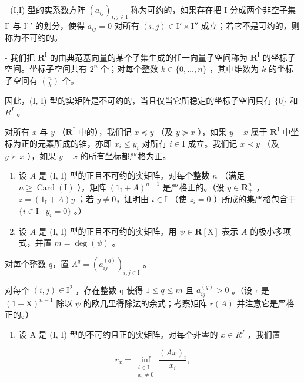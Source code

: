- (I,I) 型的实系数方阵 \((a_{ij})_{i,j\in \mathrm{I}}\) 称为可约的，如果存在把 I 分成两个非空子集 I' 与 I'\,' 的划分，使得 \(a_{ij} = 0\) 对所有 \((i,j)\in \mathrm{I}'\times \mathrm{I}''\) 成立；若它不是可约的，则称为不可约的。

- 我们把 \(\mathbf{R}^{\mathrm{I}}\) 的由典范基向量的某个子集生成的任一向量子空间称为 \(\mathbf{R}^{\mathrm{I}}\) 的坐标子空间。坐标子空间共有 \(2^{n}\) 个；对每个整数 \(k\in\{0,\ldots,n\}\) ，其中维数为 \(k\) 的坐标子空间有 \(\binom{n}{k}\) 个。

因此，(I, I) 型的实矩阵是不可约的，当且仅当它所稳定的坐标子空间只有 \(\{0\}\) 和 \(R^{I}\) 。

对所有 \(x\) 与 \(y\) （\(\mathbf{R}^{\mathrm{I}}\) 中的），我们记 \(x \preccurlyeq y\) （及 \(y \succcurlyeq x\) ），如果 \(y - x\) 属于 \(\mathbf{R}^{\mathrm{I}}\) 中坐标为正的元素所成的锥，亦即 \(x_i \leqslant y_i\) 对所有 \(i \in \mathrm{I}\) 成立。我们记 \(x \prec y\) （及 \(y \succ x\) ），如果 \(y - x\) 的所有坐标都严格为正。

\begin{enumerate}
\def\labelenumi{\arabic{enumi})}
\setcounter{enumi}{9}
\item
  设 \(A\) 是 (I, I) 型的正且不可约的实矩阵。对每个整数 \(n\) （满足 \(n \geqslant \operatorname{Card}(\mathrm{I})\) ），矩阵 \((1_{\mathrm{I}} + A)^{n-1}\) 是严格正的。（设 \(y \in \mathbf{R}_{+}^{n}\) ，\(z = (1_{\mathrm{I}} + A)y\) ；若 \(y \neq 0\)，证明由 \(i \in \mathrm{I}\) （使 \(z_{i} = 0\) ）所成的集严格包含于 \(\{i \in \mathrm{I} \mid y_{i} = 0\}\) 。）
\item
  设 \(A\) 是 (I, I) 型的正且不可约的实矩阵。用 \(\psi \in \mathbf{R}[\mathrm{X}]\) 表示 \(A\) 的极小多项式，并置 \(m = \deg(\psi)\) 。
\end{enumerate}

对每个整数 \(q\)，置 \(A^q = (a_{ij}^{(q)})_{i,j \in \mathrm{I}}\) 。

对每个 \((i,j)\in\mathrm{I}^{2}\) ，存在整数 q 使得 \(1\leqslant q\leqslant m\) 且 \(a_{ij}^{(q)}>0\) 。（设 r 是 \((1+\mathrm{X})^{n-1}\) 除以 \(\psi\) 的欧几里得除法的余式；考察矩阵 \(r(A)\) 并注意它是严格正的。）

\begin{enumerate}
\def\labelenumi{\arabic{enumi})}
\setcounter{enumi}{11}
\tightlist
\item
  设 A 是 (I, I) 型的不可约且正的实矩阵。对每个非零的 \(x \in R^{I}\) ，我们置
\end{enumerate}

\[
r_{x} = \inf_{\substack{i\in \mathrm{I}\\ x_{i}\neq 0}}\frac{(Ax)_{i}}{x_{i}},
\]

